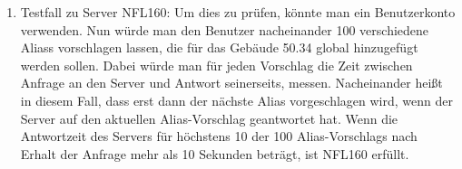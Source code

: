 \begin{enumerate}[label=\textbf{/T\arabic*0/}, align=left]
	\item Testfall zu Server NFL160: Um dies zu prüfen, könnte man ein \Gls{Benutzer}konto verwenden. Nun würde man den \Gls{Benutzer} nacheinander 100 verschiedene \Glspl{Alias} vorschlagen lassen, die für das Gebäude 50.34 \gls{global} hinzugefügt werden sollen. Dabei würde man für jeden Vorschlag die Zeit zwischen Anfrage an den \Gls{Server} und Antwort seinerseits, messen. Nacheinander heißt in diesem Fall, dass erst dann der nächste \Gls{Alias} vorgeschlagen wird, wenn der \Gls{Server} auf den aktuellen \Gls{Alias-Vorschlag} geantwortet hat. Wenn die Antwortzeit des \Gls{Server}s für höchstens 10 der 100 \Glspl{Alias-Vorschlag} nach Erhalt der Anfrage mehr als 10 Sekunden beträgt, ist NFL160 erfüllt.
\end{enumerate}